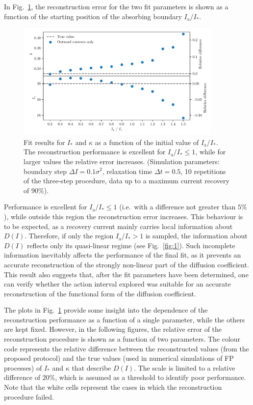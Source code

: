 In Fig.~\ref{fig:different_position}, the reconstruction error for the two fit parameters is shown as a function of the starting position of the absorbing boundary $I_\mathrm{a}/I_\ast$. 
%
\begin{figure}[t]
    \centering
    \includegraphics[width=0.9\textwidth]{4_probing_the_diffusive_behavior/figs/final/different_position.pdf}
    \caption{Fit results for $I_\ast$ and $\kappa$ as a function of the initial value of $I_\mathrm{a}/I_\ast$. The reconstruction performance is excellent for $I_\mathrm{a}/I_\ast \leq 1$, while for larger values the relative error increases. (Simulation parameters: boundary step $\Delta I=0.1 \sigma^2$, relaxation time $\Delta t=0.5$, 10 repetitions of the three-step procedure, data up to a maximum current recovery of $90\%$).}
    \label{fig:different_position}
\end{figure}
%
Performance is excellent for $I_\mathrm{a}/I_\ast \leq 1$ {(i.e.\ with a difference not greater than $5\%$)}, while outside this region the reconstruction error increases. This behaviour is to be expected, as a recovery current mainly carries local information about $D(I)$. Therefore, if only the region $I_\mathrm{a}/I_\ast > 1$ is sampled, the information about $D(I)$ reflects only its quasi-linear regime (see Fig.~\ref{fig:1}). Such incomplete information inevitably affects the performance of the final fit, as it prevents an accurate reconstruction of the strongly non-linear part of the diffusion coefficient. This result also suggests that, after the fit parameters have been determined, one can verify whether the action interval explored was suitable for an accurate reconstruction of the functional form of the diffusion coefficient.

The plots in Fig.~\ref{fig:different_position} provide some insight into the dependence of the reconstruction performance as a function of a single parameter, while the others are kept fixed. However, in the following figures, the relative error of the reconstruction procedure is shown as a function of two parameters. The colour code represents the relative difference between the reconstructed values (from the proposed protocol) and the true values (used in numerical simulations of FP processes) of $I_\ast$ and $\kappa$ that describe $D(I)$. The scale is limited to a relative difference of $20\%$, which is assumed as a threshold to identify poor performance. Note that the white cells represent the cases in which the reconstruction procedure failed.

